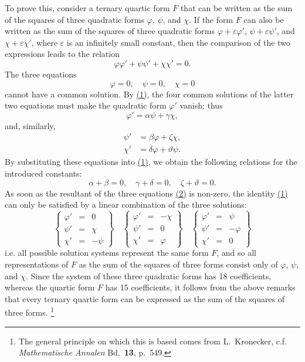 \documentclass{article}
\newcommand{\oldpage}[1]{\marginpar{\footnotesize$\Big\vert$ \textit{p.~#1}}}
\begin{document}
To prove this, consider a ternary quartic form $F$ that can be written as the sum of the squares of three quadratic forms $\varphi$, $\psi$, and $\chi$.
If the form $F$ can also be written as the sum of the squares of three quadratic forms $\varphi+\varepsilon\varphi'$, $\psi+\varepsilon\psi'$, and $\chi+\varepsilon\chi'$, where $\varepsilon$ is an infinitely small constant, then the comparison of the two expressions leads to the relation
\[
\label{equation1}
  \varphi\varphi' + \psi\psi' + \chi\chi' = 0.
  \tag{1}
\]
The three equations
\[
\label{equation2}
  \varphi=0,
  \quad\psi=0,
  \quad\chi=0
  \tag{2}
\]
cannot have a common solution.
By \hyperref[equation1]{(1)}, the four common solutions of the latter two equations must make
\oldpage{343}
the quadratic form $\varphi'$ vanish;
thus
\[
  \varphi' = \alpha\psi+\gamma\chi,
\]
and, similarly,
\begin{align*}
  \psi' &= \beta\varphi+\zeta\chi,
\\\chi' &= \delta\varphi+\vartheta\psi.
\end{align*}
By substituting these equations into \hyperref[equation1]{(1)}, we obtain the following relations for the introduced constants:
\[
  \alpha+\beta = 0,
  \quad\gamma+\delta = 0,
  \quad\zeta+\vartheta = 0.
\]
As soon as the resultant of the three equations \hyperref[equation2]{(2)} is non-zero, the identity \hyperref[equation1]{(1)} can only be satisfied by a linear combination of the three solutions:
\[
  \left\{
    \begin{array}{rcr}
      \varphi' &= &0
    \\\psi' &= &\chi
    \\\chi' &= &-\psi
    \end{array}
  \right\}
  \quad
  \left\{
    \begin{array}{rcr}
      \varphi' &= &-\chi
    \\\psi' &= &0
    \\\chi' &= &\varphi
    \end{array}
  \right\}
  \quad
  \left\{
    \begin{array}{rcr}
      \varphi' &= &\psi
    \\\psi' &= &-\varphi
    \\\chi' &= &0
    \end{array}
  \right\}
\]
i.e. all possible solution systems represent the same form $F$, and so all representations of $F$ as the sum of the squares of three forms consist only of $\varphi$, $\psi$, and $\chi$.
Since the system of these three quadratic forms has 18 coefficients, whereas the quartic form $F$ has 15 coefficients, it follows from the above remarks that every ternary quartic form can be expressed as the sum of the squares of three forms.
\footnote{The general principle on which this is based comes from L.~Kronecker, c.f. \emph{Mathematische Annalen} Bd.~\textbf{13}, p.~549.}
\end{document}
